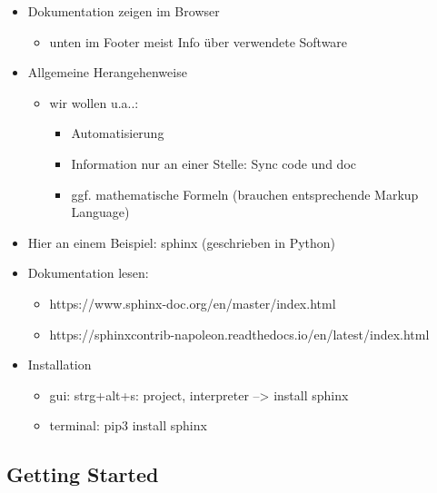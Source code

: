 \begin{itemize}
\item
  Dokumentation zeigen im Browser

  \begin{itemize}
  \tightlist
  \item
    unten im Footer meist Info über verwendete Software
  \end{itemize}
\item
  Allgemeine Herangehenweise

  \begin{itemize}
  \tightlist
  \item
    wir wollen u.a..:

    \begin{itemize}
    \tightlist
    \item
      Automatisierung
    \item
      Information nur an einer Stelle: Sync code und doc
    \item
      ggf. mathematische Formeln (brauchen entsprechende Markup
      Language)
    \end{itemize}
  \end{itemize}
\item
  Hier an einem Beispiel: sphinx (geschrieben in Python)
\item
  Dokumentation lesen:

  \begin{itemize}
  \tightlist
  \item
    https://www.sphinx-doc.org/en/master/index.html
  \item
    https://sphinxcontrib-napoleon.readthedocs.io/en/latest/index.html
  \end{itemize}
\item
  Installation

  \begin{itemize}
  \tightlist
  \item
    gui: strg+alt+s: project, interpreter --\textgreater{} install
    sphinx
  \item
    terminal: pip3 install sphinx
  \end{itemize}
\end{itemize}

\hypertarget{getting-started}{%
\subsection{\texorpdfstring{\textbf{Getting
Started}}{Getting Started}}\label{getting-started}}

